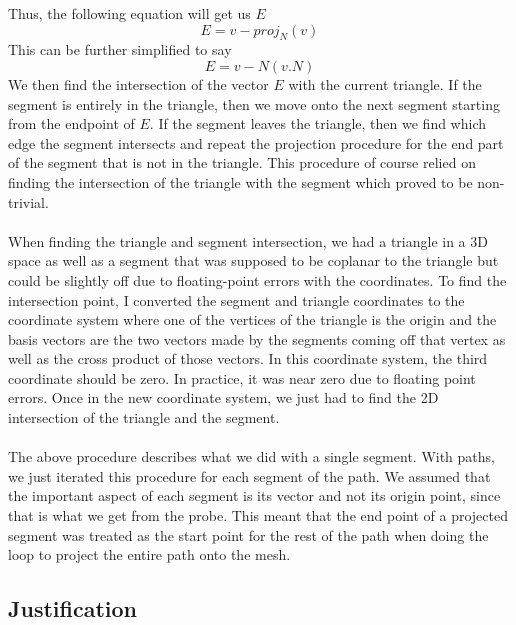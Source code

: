 \documentclass[conference]{acmsiggraph}
\begin{document}
Thus, the following equation will get us $E$
\[
E = v - proj_N(v)
\]
This can be further simplified to say
\[
E = v - N(v.N)
\]
We then find the intersection of the vector $E$ with the current triangle. If the segment is entirely in the triangle, then we move onto the next segment starting from the endpoint of $E$. If the segment leaves the triangle, then we find which edge the segment intersects and repeat the projection procedure for the end part of the segment that is not in the triangle. This procedure of course relied on finding the intersection of the triangle with the segment which proved to be non-trivial.\\
\\
When finding the triangle and segment intersection, we had a triangle in a 3D space as well as a segment that was supposed to be coplanar to the triangle but could be slightly off due to floating-point errors with the coordinates. To find the intersection point, I converted the segment and triangle coordinates to the coordinate system where one of the vertices of the triangle is the origin and the basis vectors are the two vectors made by the segments coming off that vertex as well as the cross product of those vectors. In this coordinate system, the third coordinate should be zero. In practice, it was near zero due to floating point errors. Once in the new coordinate system, we just had to find the 2D intersection of the triangle and the segment. \\
\\
The above procedure describes what we did with a single segment. With paths, we just iterated this procedure for each segment of the path. We assumed that the important aspect of each segment is its vector and not its origin point, since that is what we get from the probe. This meant that the end point of a projected segment was treated as the start point for the rest of the path when doing the loop to project the entire path onto the mesh.

\subsection{Justification}
\end{document}
